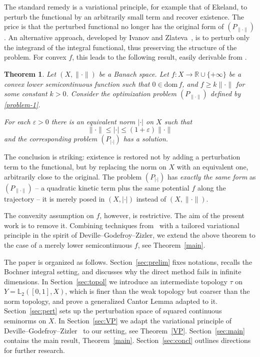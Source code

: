 \documentclass[12pt,leqno]{article}
\newtheorem{thm}{Theorem}[section]
\theoremstyle{definition}
\theoremstyle{remark}
\def\dom{\mathrm{dom\,}}
\def\L{\mathbb{L}}
\begin{document}
The standard remedy is a variational principle, for example that of Ekeland, to perturb the functional by an arbitrarily small term and recover existence. The price is that the perturbed functional no longer has the original form of $(P_{\|\cdot\|})$. An alternative approach, developed by Ivanov and Zlateva~\cite{iv_var_integr,iz_integr_funct}, is to perturb only the integrand of the integral functional, thus preserving the structure of the problem. For convex $f$, this leads to the following result, easily derivable from \cite[Theorem~1.1]{iv_var_integr}.

\begin{thm}
\label{thm:iz}
    Let $(X,\|\cdot\|)$ be a Banach space. Let $f: X \to \mathbb{R} \cup\{+\infty\}$ be a convex lower semicontinuous function such that $0\in \dom f$, and $f\geq k\|\cdot\|$ for some constant $k>0$. Consider the optimization problem $\left(P_{\|\cdot\|}\right)$ defined by \eqref{problem-1}.

    For each $\varepsilon>0$ there is an equivalent norm $|\cdot|$ on $X$ such that
$$
\|\cdot\| \le |\cdot| \le (1+\varepsilon)\|\cdot\|
$$
and the corresponding problem $\left(P_{|\cdot|}\right)$ has a solution.
\end{thm}

The conclusion is striking: existence is restored not by adding a perturbation term to the functional, but by replacing the norm on $X$ with an equivalent one, arbitrarily close to the original. The problem $(P_{|\cdot|})$ has \emph{exactly the same form} as $(P_{\|\cdot\|})$ -- a quadratic kinetic term plus the same potential $f$ along the trajectory -- it is merely posed in $(X,|\cdot|)$ instead of $(X,\|\cdot\|)$.

The convexity assumption on $f$, however, is restrictive. The aim of the present work is to remove it. Combining techniques from~\cite{iv_var_integr,iz_integr_funct,Orlitz} with a tailored variational principle in the spirit of Deville--Godefroy--Zizler, we extend the above theorem to the case of a merely lower semicontinuous $f$, see Theorem~\ref{main}.

\medskip

The paper is organized as follows. Section~\ref{sec:prelim} fixes notations, recalls the Bochner integral setting, and discusses why the direct method fails in infinite dimensions. In Section~\ref{sec:topol} we introduce an intermediate topology $\tau$ on $Y=\L_2([0,1],X)$, which is finer than the weak topology but coarser than the norm topology, and prove a generalized Cantor Lemma adapted to it. Section~\ref{sec:pert} sets up the perturbation space of squared continuous seminorms on $X$. In Section~\ref{sec:VP} we adapt the variational principle of Deville--Godefroy--Zizler~\cite{DGZ,DGZ-book} to our setting, see Theorem~\ref{VP}. Section~\ref{sec:main} contains the main result, Theorem~\ref{main}. Section~\ref{sec:concl} outlines directions for further research.
\end{document}
